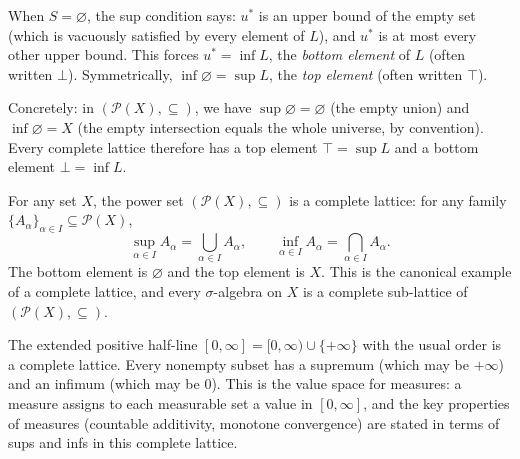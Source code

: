\begin{remark*}
\label{rem:complete-top-bottom}
When $S = \varnothing$, the sup condition says: $u^*$ is an upper bound of
the empty set (which is vacuously satisfied by every element of $L$), and $u^*$
is at most every other upper bound.  This forces $u^* = \inf L$, the
\emph{bottom element} of $L$ (often written $\bot$).  Symmetrically,
$\inf \varnothing = \sup L$, the \emph{top element} (often written $\top$).

Concretely: in $(\mathcal{P}(X), \subseteq)$, we have $\sup \varnothing =
\varnothing$ (the empty union) and $\inf \varnothing = X$ (the empty
intersection equals the whole universe, by convention).  Every complete
lattice therefore has a top element $\top = \sup L$ and a bottom element
$\bot = \inf L$.
\end{remark*}

\begin{example*}
\label{ex:power-set-complete}
For any set $X$, the power set $(\mathcal{P}(X), \subseteq)$ is a complete
lattice: for any family $\{A_\alpha\}_{\alpha \in I} \subseteq \mathcal{P}(X)$,
\[
  \sup_{\alpha \in I} A_\alpha = \bigcup_{\alpha \in I} A_\alpha,
  \qquad
  \inf_{\alpha \in I} A_\alpha = \bigcap_{\alpha \in I} A_\alpha.
\]
The bottom element is $\varnothing$ and the top element is $X$.  This is the
canonical example of a complete lattice, and every $\sigma$-algebra on $X$ is a
complete sub-lattice of $(\mathcal{P}(X), \subseteq)$.
\end{example*}

\begin{example*}
\label{ex:extended-positive}
The extended positive half-line $[0,\infty] = [0,\infty) \cup \{+\infty\}$
with the usual order is a complete lattice.  Every nonempty subset has a
supremum (which may be $+\infty$) and an infimum (which may be $0$).  This
is the value space for measures: a measure assigns to each measurable set
a value in $[0,\infty]$, and the key properties of measures (countable
additivity, monotone convergence) are stated in terms of sups and infs in
this complete lattice.
\end{example*}


